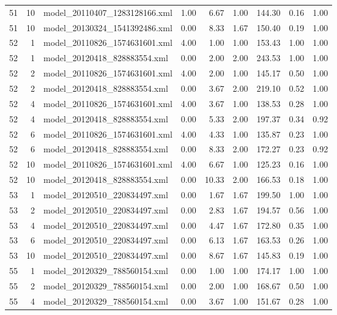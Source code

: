 \begin{table}[ht]
\begin{tabular}{rrlrrrrrr}
   51 &  10 & model\_20110407\_1283128166.xml & 1.00 & 6.67 & 1.00 & 144.30 & 0.16 & 1.00 \\ 
   51 &  10 & model\_20130324\_1541392486.xml & 0.00 & 8.33 & 1.67 & 150.40 & 0.19 & 1.00 \\ 
   52 &   1 & model\_20110826\_1574631601.xml & 4.00 & 1.00 & 1.00 & 153.43 & 1.00 & 1.00 \\ 
   52 &   1 & model\_20120418\_828883554.xml & 0.00 & 2.00 & 2.00 & 243.53 & 1.00 & 1.00 \\ 
   52 &   2 & model\_20110826\_1574631601.xml & 4.00 & 2.00 & 1.00 & 145.17 & 0.50 & 1.00 \\ 
   52 &   2 & model\_20120418\_828883554.xml & 0.00 & 3.67 & 2.00 & 219.10 & 0.52 & 1.00 \\ 
   52 &   4 & model\_20110826\_1574631601.xml & 4.00 & 3.67 & 1.00 & 138.53 & 0.28 & 1.00 \\ 
   52 &   4 & model\_20120418\_828883554.xml & 0.00 & 5.33 & 2.00 & 197.37 & 0.34 & 0.92 \\ 
   52 &   6 & model\_20110826\_1574631601.xml & 4.00 & 4.33 & 1.00 & 135.87 & 0.23 & 1.00 \\ 
   52 &   6 & model\_20120418\_828883554.xml & 0.00 & 8.33 & 2.00 & 172.27 & 0.23 & 0.92 \\ 
   52 &  10 & model\_20110826\_1574631601.xml & 4.00 & 6.67 & 1.00 & 125.23 & 0.16 & 1.00 \\ 
   52 &  10 & model\_20120418\_828883554.xml & 0.00 & 10.33 & 2.00 & 166.53 & 0.18 & 1.00 \\ 
   53 &   1 & model\_20120510\_220834497.xml & 0.00 & 1.67 & 1.67 & 199.50 & 1.00 & 1.00 \\ 
   53 &   2 & model\_20120510\_220834497.xml & 0.00 & 2.83 & 1.67 & 194.57 & 0.56 & 1.00 \\ 
   53 &   4 & model\_20120510\_220834497.xml & 0.00 & 4.47 & 1.67 & 172.80 & 0.35 & 1.00 \\ 
   53 &   6 & model\_20120510\_220834497.xml & 0.00 & 6.13 & 1.67 & 163.53 & 0.26 & 1.00 \\ 
   53 &  10 & model\_20120510\_220834497.xml & 0.00 & 8.67 & 1.67 & 145.83 & 0.19 & 1.00 \\ 
   55 &   1 & model\_20120329\_788560154.xml & 0.00 & 1.00 & 1.00 & 174.17 & 1.00 & 1.00 \\ 
   55 &   2 & model\_20120329\_788560154.xml & 0.00 & 2.00 & 1.00 & 168.67 & 0.50 & 1.00 \\ 
   55 &   4 & model\_20120329\_788560154.xml & 0.00 & 3.67 & 1.00 & 151.67 & 0.28 & 1.00 \\ 

\end{tabular}
\end{table}
